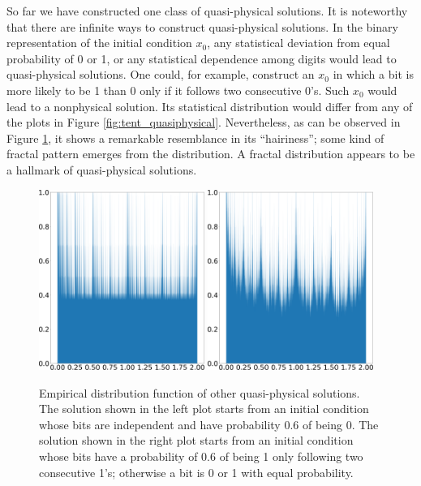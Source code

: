 So far we have constructed one class of quasi-physical solutions.
It is noteworthy that there are infinite ways to 
construct quasi-physical solutions.  In the binary representation 
of the initial condition $x_0$, any statistical
deviation from equal probability of 0 or 1, or any statistical
dependence among digits would lead to quasi-physical solutions.
One could, for example, construct an $x_0$ in which a bit is
more likely to be 1 than 0 only if it follows two consecutive 0's.
Such $x_0$ would lead to a nonphysical solution.  Its statistical
distribution would differ from any of the plots in Figure
\ref{fig:tent_quasiphysical}.  Nevertheless, as can be
observed in Figure \ref{fig:tent_alternative}, it shows
a remarkable resemblance in its ``hairiness''; some kind of fractal
pattern emerges from the distribution.  A fractal distribution
appears to be a hallmark of quasi-physical solutions.
\begin{figure}[H]\centering
    \centering
    \includegraphics[width=0.48\textwidth]{figure/tent_quasiphysical_alternaive1_hist_p_0.6.png}
    \hspace{0.02\textwidth}
    \includegraphics[width=0.48\textwidth]{figure/tent_quasiphysical_alternaive2_hist_p_0.6.png}
    \caption{Empirical distribution function of other quasi-physical solutions.
    The solution shown in the left plot starts from an initial condition
    whose bits are independent and have probability 0.6 of being 0.
    The solution shown in the right plot starts from an initial condition
    whose bits have a probability of 0.6 of being 1 only following two
    consecutive 1's; otherwise a bit is 0 or 1 with equal probability.}
    \label{fig:tent_alternative}
\end{figure}

